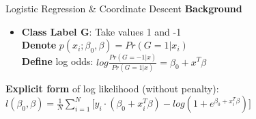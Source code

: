\documentclass{beamer}
\begin{document}
\begin{frame}{Logistic Regression \& Coordinate Descent}
\textbf{Background}
\vspace*{3mm}

    \begin{itemize}
        \item \textbf{Class Label G}: Take values 1 and -1 \\
         \vspace*{1mm}
          \textbf{Denote} \(p(x_{i};\beta_0,\beta) = Pr(G=1\lvert x_{i})\) \\
          \vspace*{1mm}
     \textbf{Define} log odds: \(log\frac{Pr(G=-1 \lvert x)}{Pr(G=1 \lvert x)} = \beta_0 +x^T \beta\) \\

    \end{itemize}
 {
\textbf{Explicit form} of log likelihood (without penalty): \(l(\beta_0,\beta)=\frac{1}{N}\sum_{i=1}^{N}\big[ y_i \cdot(\beta_0 +x_i^T \beta) -log(1+e^{\beta_0 +x_i^T \beta})\big]\)
}
 
\end{frame}
\end{document}

